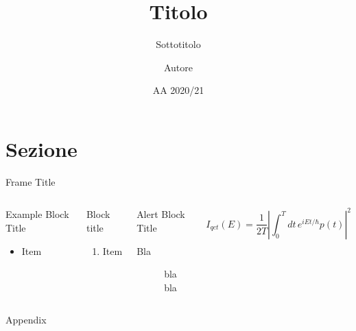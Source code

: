 \documentclass[aspectratio=169,10pt]{beamer}
\author[Autore]{Autore}
\title[Titolo]{Titolo}
\subtitle{Sottotitolo}
\date{AA 2020/21}
\begin{document}

\begin{frame}[plain]
\titlepage
\end{frame}

\section[Sezione]{Sezione}

\begin{frame}{Frame Title}

\begin{columns}
\begin{exampleblock}{Example Block Title}
\begin{itemize}
\item Item
\end{itemize}
\end{exampleblock}

\begin{block}{Block title}
\begin{enumerate}
    \item Item
\end{enumerate}
\end{block}

\begin{alertblock}{Alert Block Title}
\begin{description}
\item[Bla] bla bla
\end{description}

\end{alertblock}
\[
I_{qct}(E) = \frac{1}{2T} \left\vert \int_{0}^{T} dt \, e^{iEt/\hbar} p (t) \right\vert^{2}
\]
\end{columns}
\end{frame}

\Unimithankswhite
\Unimithankscolor
{}

\appendix

\begin{frame}{Appendix}
    
\end{frame}
\end{document}
